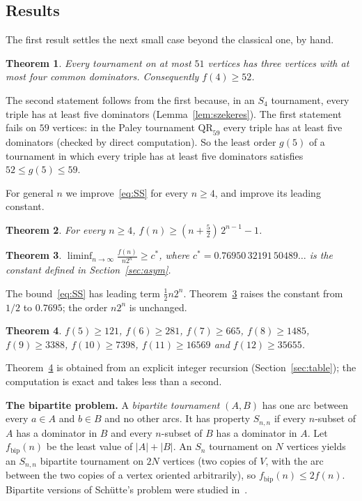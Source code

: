 \documentclass[11pt]{amsart}
\newtheorem{theorem}{Theorem}[section]
\theoremstyle{definition}
\theoremstyle{remark}
\newcommand{\QR}{\mathrm{QR}}
\newcommand{\cs}{c^{*}}
\newcommand{\fb}{f_{\mathrm{bip}}}
\newcommand{\abs}[1]{\lvert #1\rvert}
\begin{document}
\subsection{Results}

The first result settles the next small case beyond the classical one, by hand.

\begin{theorem}\label{thm:f4}
Every tournament on at most $51$ vertices has three vertices with at most four common dominators. Consequently $f(4)\ge 52$.
\end{theorem}

The second statement follows from the first because, in an $S_4$ tournament, every triple has at least five dominators
(Lemma~\ref{lem:szekeres}). The first statement fails on $59$ vertices: in the Paley tournament $\QR_{59}$ every triple has at
least five dominators (checked by direct computation). So the least order $g(5)$ of a tournament in which every triple has at least
five dominators satisfies $52\le g(5)\le59$.

For general $n$ we improve~\eqref{eq:SS} for every $n\ge 4$, and improve its leading constant.

\begin{theorem}\label{thm:B}
For every $n\ge 4$, $f(n)\ge (n+\tfrac52)\,2^{n-1}-1$.
\end{theorem}

\begin{theorem}\label{thm:C}
$\displaystyle \liminf_{n\to\infty}\frac{f(n)}{n2^n}\ge \cs$, where $\cs=0.76950\,32191\,50489\ldots$ is the constant defined in
Section~\ref{sec:asym}.
\end{theorem}

The bound~\eqref{eq:SS} has leading term $\tfrac12 n2^n$. Theorem~\ref{thm:C} raises the constant from $1/2$ to $0.7695$; the
order $n2^n$ is unchanged.

\begin{theorem}\label{thm:D}
$f(5)\ge 121$, $f(6)\ge 281$, $f(7)\ge 665$, $f(8)\ge 1485$, $f(9)\ge 3388$, $f(10)\ge 7398$, $f(11)\ge 16569$ and
$f(12)\ge 35655$.
\end{theorem}

Theorem~\ref{thm:D} is obtained from an explicit integer recursion (Section~\ref{sec:table}); the computation is exact and
takes less than a second.

\smallskip
\noindent\textbf{The bipartite problem.}
A \emph{bipartite tournament} $(A,B)$ has one arc between every $a\in A$ and $b\in B$ and no other arcs. It has property
$S_{n,n}$ if every $n$-subset of $A$ has a dominator in $B$ and every $n$-subset of $B$ has a dominator in $A$. Let $\fb(n)$ be the
least value of $\abs{A}+\abs{B}$. An $S_n$ tournament on $N$ vertices yields an $S_{n,n}$ bipartite tournament on $2N$ vertices
(two copies of $V$, with the arc between the two copies of a vertex oriented arbitrarily), so $\fb(n)\le 2f(n)$. Bipartite versions of Sch\"utte's problem were studied in~\cite{BGHT03}.
\end{document}
